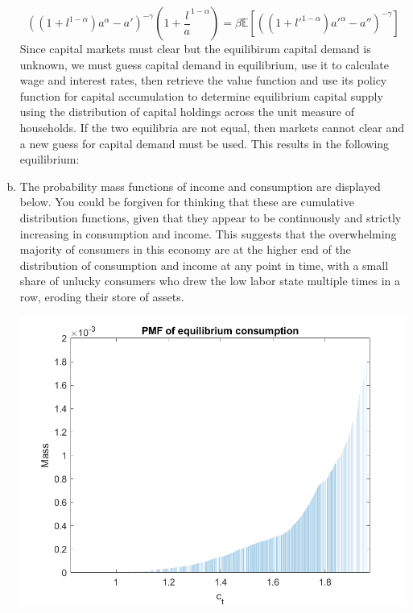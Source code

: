 \documentclass{article}
\newcommand{\E}[1]{\mathbb{E}\left[#1\right]} %
\begin{document}
\begin{enumerate}[(a)]
{\[		\]
		}%
		\[
			\left((1+l^{1-\alpha})a^\alpha - a'\right)^{-\gamma}\left(1+\frac{l}{a}^{1-\alpha}\right) = 
			\beta\E{\left((1+l'^{1-\alpha})a'^\alpha - a''\right)^{-\gamma}}
		\]
		Since capital markets must clear but the equilibirum capital demand is unknown, we must guess capital demand in equilibrium, use it to calculate wage and interest rates, then retrieve the value function and use its policy function for capital accumulation to determine equilibrium capital supply using the distribution of capital holdings across the unit measure of households. If the two equilibria are not equal, then markets cannot clear and a new guess for capital demand must be used. This results in the following equilibrium:
			
	
	\item The probability mass functions of income and consumption are displayed below. You could be forgiven for thinking that these are cumulative distribution functions, given that they appear to be continuously and strictly increasing in consumption and income. This suggests that the overwhelming majority of consumers in this economy are at the higher end of the distribution of consumption and income at any point in time, with a small share of unlucky consumers who drew the low labor state multiple times in a row, eroding their store of assets. 
		\begin{center}
			\includegraphics[scale=.35]{figure1bi.png}

\end{center}
\end{enumerate}
\end{document}
